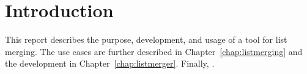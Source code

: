 %
%
% 
% 
% 

\chapter{Introduction}
\label{chap:intro}

This report describes the purpose, development, and usage of a tool for
list merging. The use cases are further described in
Chapter~\ref{chap:listmerging} and the development in
Chapter~\ref{chap:listmerger}. Finally, \TODO{}.
